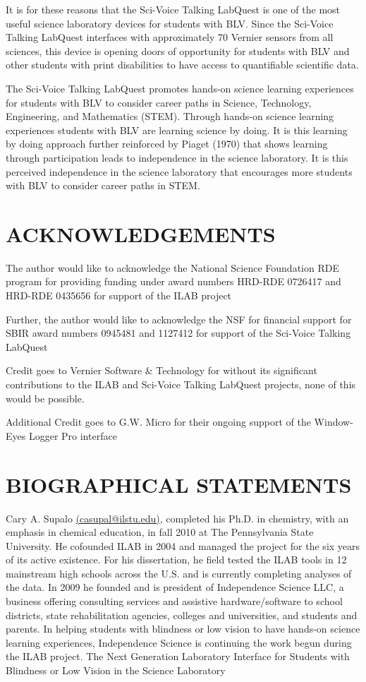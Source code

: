 \documentclass[11.5pt]{sig-alternate} %
\begin{document}
\begin{large}
It is for these reasons that the Sci-Voice Talking LabQuest is one of the most useful science laboratory devices for students with BLV. Since the Sci-Voice Talking LabQuest interfaces with approximately 70 Vernier sensors from all sciences, this device is opening doors of opportunity for students with BLV and other students with print disabilities to have access to quantifiable scientific data.

The Sci-Voice Talking LabQuest promotes hands-on science learning experiences for students with BLV to consider career paths in Science, Technology, Engineering, and Mathematics (STEM). Through hands-on science learning experiences students with BLV are learning science by doing. It is this learning by doing approach further reinforced by Piaget (1970) that shows learning through participation leads to independence in the science laboratory. It is this perceived independence in the science laboratory that encourages more students with BLV to consider career paths in STEM.

\section*{ACKNOWLEDGEMENTS}

The author would like to acknowledge the National Science Foundation RDE program for providing funding under award numbers HRD-RDE 0726417 and HRD-RDE 0435656 for support of the ILAB project

Further, the author would like to acknowledge the NSF for financial support for SBIR award numbers 0945481 and 1127412 for support of the Sci-Voice Talking LabQuest 

Credit goes to Vernier Software \& Technology for without its significant contributions to the ILAB and Sci-Voice Talking LabQuest projects, none of this would be possible. 

Additional Credit goes to G.W. Micro for their ongoing support of the Window-Eyes Logger Pro interface

\section*{BIOGRAPHICAL STATEMENTS}

Cary A. Supalo \href{mailto:casupal@ilstu.edu}{(casupal@ilstu.edu)}, completed his Ph.D. in chemistry, with an emphasis in chemical education, in fall 2010 at The Pennsylvania State University. He cofounded ILAB in 2004 and managed the project for the six years of its active existence. For his dissertation, he field tested the ILAB tools in 12 mainstream high schools across the U.S. and is currently completing analyses of the data. In 2009 he founded and is president of Independence Science LLC, a business offering consulting services and assistive hardware/software to school districts, state rehabilitation agencies, colleges and universities, and students and parents. In helping students with blindness or low vision to have hands-on science learning experiences, Independence Science is continuing the work begun during the ILAB project. The Next Generation Laboratory Interface for Students with Blindness or Low Vision in the Science Laboratory

\end{large}
\clearpage
\end{document}
